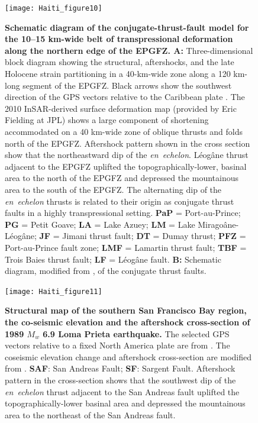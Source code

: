 \documentclass[linenumbers,draft]{agujournal}
\begin{document}
\begin{figure}
\centering
\texttt{[image: Haiti\_figure10]}
\caption{\textbf{Schematic diagram of the conjugate-thrust-fault model for the 10--15 km-wide belt of transpressional deformation along the northern edge of the EPGFZ. A:} Three-dimensional block diagram showing the structural, aftershocks, and the late Holocene strain partitioning in a 40-km-wide zone along a 120 km-long segment of the EPGFZ. Black arrows show the southwest direction of the GPS vectors relative to the Caribbean plate \citep{calais2010transpressional}. The 2010 InSAR-derived surface deformation map (provided by Eric Fielding at JPL) \citep{hayes2010complex} shows a large component of shortening accommodated on a 40 km-wide zone of oblique thrusts and folds north of the EPGFZ. Aftershock pattern shown in the cross section show that the northeastward dip of the \textit{en~echelon}. L\'eog\^ane thrust adjacent to the EPGFZ uplifted the topographically-lower, basinal area to the north of the EPGFZ and depressed the mountainous area to the south of the EPGFZ. The alternating dip of the \textit{en~echelon} thrusts is related to their origin as conjugate thrust faults in a highly transpressional setting. \textbf{PaP} = Port-au-Prince; \textbf{PG} = Petit Goave; \textbf{LA} = Lake Azuey; \textbf{LM} = Lake Mirago\^ane-L\'eog\^ane; \textbf{JF} = Jimani thrust fault; \textbf{DT} = Dumay thrust; \textbf{PFZ} = Port-au-Prince fault zone; \textbf{LMF} = Lamartin thrust fault; \textbf{TBF} = Trois Baies thrust fault; \textbf{LF} = L\'eog\^ane fault. \textbf{B:} Schematic diagram, modified from \citet{sibson2012reverse}, of the conjugate thrust faults.}
\label{figure10}
\end{figure}

\begin{figure}
\centering
\texttt{[image: Haiti\_figure11]}
\caption{\textbf{Structural map of the southern San Francisco Bay region, the co-seismic elevation and the aftershock cross-section of 1989 $M_w$ 6.9  Loma Prieta earthquake.} The selected GPS vectors relative to a fixed North America plate are from \citet{UNAVCO2009}. The coseismic elevation change and aftershock cross-section are modified from \citet{marshall1991faulting}. \textbf{SAF}: San Andreas Fault; \textbf{SF}: Sargent Fault. Aftershock pattern in the cross-section shows that the southwest dip of the \textit{en~echelon} thrust adjacent to the San Andreas fault uplifted the topographically-lower basinal area and depressed the mountainous area to the northeast of the San Andreas fault.}
\label{figure11}
\end{figure}
\end{document}
